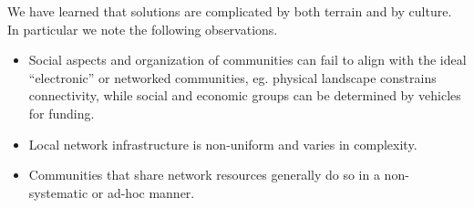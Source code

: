 
We have learned that solutions are complicated by both terrain and by culture.
In particular we note the following observations.
\begin{itemize}%
\item Social aspects and organization of communities can fail to align with the
  ideal ``electronic'' or networked communities, eg. physical landscape constrains
  connectivity, while social and economic groups can be determined by vehicles for funding.
\item Local network infrastructure is non-uniform and varies in complexity.
\item Communities that share network resources generally do so in a
  non-systematic or ad-hoc manner.
\end{itemize}


